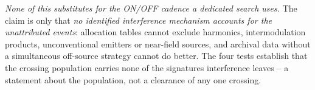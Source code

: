 \emph{None of this substitutes for the ON/OFF cadence a dedicated search
uses.} The claim is only that \emph{no
identified interference mechanism accounts for the unattributed events}:
allocation tables cannot exclude harmonics, intermodulation products,
unconventional emitters or near-field sources, and archival data without a
simultaneous off-source strategy cannot do better. The four tests establish
that the crossing population carries none of the signatures interference
leaves -- a statement about the population, not a clearance of any one
crossing.

